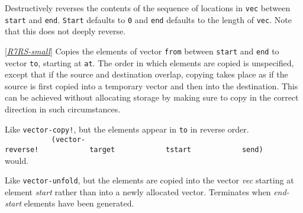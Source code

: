 \begin{entry}{%
  }

  Destructively reverses the contents of the sequence of locations in
  \texttt{vec} between \texttt{start} and \texttt{end}. \texttt{Start}
  defaults to \texttt{0} and \texttt{end} defaults to the length of
  \texttt{vec}. Note that this does not deeply reverse.
\end{entry}

\begin{entry}{%
  }

  {[}\protect\hyperlink{R7RS-small}{\emph{R7RS-small}}{]} Copies the
  elements of vector \texttt{from} between \texttt{start} and
  \texttt{end} to vector \texttt{to}, starting at \texttt{at}. The
  order in which elements are copied is unspecified, except that if
  the source and destination overlap, copying takes place as if the
  source is first copied into a temporary vector and then into the
  destination. This can be achieved without allocating storage by
  making sure to copy in the correct direction in such circumstances.
\end{entry}

\begin{entry}{%
  }

  Like \texttt{vector-copy!}, but the elements appear in \texttt{to}
  in reverse order.
  \texttt{~~~~~~~~~~~(vector-reverse!~~~~~~~~~~~~target~~~~~~~~~~~~tstart~~~~~~~~~~~~send)~~~~~~~~~
  } would.
\end{entry}

\begin{entry}{%
  }

  Like \texttt{vector-unfold}, but the elements are copied into the
  vector \emph{vec} starting at element \emph{start} rather than into
  a newly allocated vector. Terminates when \emph{end-start} elements
  have been generated.
\end{entry}

